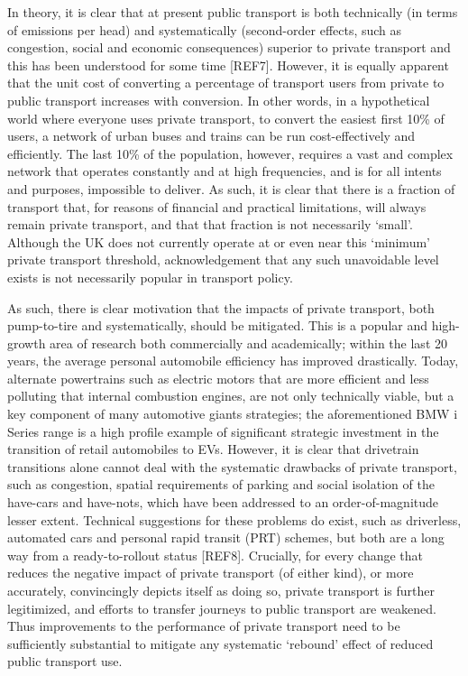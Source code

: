 \documentclass[journal]{IEEEtran}
\begin{document}
In theory, it is clear that at present public transport is both
technically (in terms of emissions per head) and systematically
(second-order effects, such as congestion, social and economic
consequences) superior to private transport and this has been
understood for some time [REF7]. However, it is equally apparent that
the unit cost of converting a percentage of transport users from
private to public transport increases with conversion. In other words,
in a hypothetical world where everyone uses private transport, to
convert the easiest first 10\% of users, a network of urban buses and
trains can be run cost-effectively and efficiently. The last 10\% of
the population, however, requires a vast and complex network that
operates constantly and at high frequencies, and is for all intents
and purposes, impossible to deliver. As such, it is clear that there
is a fraction of transport that, for reasons of financial and
practical limitations, will always remain private transport, and that
that fraction is not necessarily `small'. Although the UK does not
currently operate at or even near this ‘minimum’ private transport
threshold, acknowledgement that any such unavoidable level exists is
not necessarily popular in transport policy.

As such, there is clear motivation that the impacts of private
transport, both pump-to-tire and systematically, should be
mitigated. This is a popular and high-growth area of research both
commercially and academically; within the last 20 years, the average
personal automobile efficiency has improved drastically.  Today,
alternate  powertrains  such as electric motors that are more
efficient and less polluting that internal combustion engines, are not
only technically viable, but a key component of many automotive giants
strategies; the aforementioned BMW i Series range is a high profile
example of significant strategic investment in the transition of
retail automobiles to EVs. However, it is clear that drivetrain
transitions alone cannot deal with the systematic drawbacks of private
transport, such as congestion, spatial requirements of parking and
social isolation of the have-cars and have-nots, which have been
addressed to an order-of-magnitude lesser extent. Technical
suggestions for these problems do exist, such as driverless, automated
cars and personal rapid transit (PRT) schemes, but both are a long way
from a ready-to-rollout status [REF8]. Crucially, for every change
that reduces the negative impact of private transport (of either
kind), or more accurately, convincingly depicts itself as doing so,
private transport is further legitimized, and efforts to transfer
journeys to public transport are weakened. Thus improvements to the
performance of private transport need to be sufficiently substantial
to mitigate any systematic `rebound' effect of reduced public
transport use.
 
\end{document}
